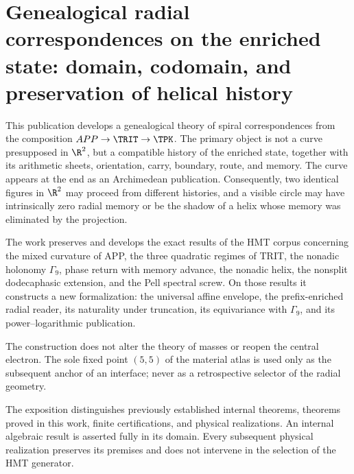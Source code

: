 \part{Genealogical radial correspondences on the enriched state: domain, codomain, and preservation of helical history}
This publication develops a genealogical theory of spiral
correspondences from the composition \(APP\to\TRIT\to\TPK\). The primary object
is not a curve presupposed in \(\R^2\), but a compatible history of the
enriched state, together with its arithmetic sheets, orientation, carry,
boundary, route, and memory. The curve appears at the end as an
Archimedean publication. Consequently, two identical figures in
\(\R^2\) may proceed from different histories, and a visible circle
may have intrinsically zero radial memory or be the shadow of
a helix whose memory was eliminated by the projection.

The work preserves and develops the exact results of the HMT corpus concerning
the mixed curvature of APP, the three quadratic regimes of TRIT, the
nonadic holonomy \(\Gamma_9\), phase return with memory advance,
the nonadic helix, the nonsplit dodecaphasic extension, and the Pell
spectral screw. On those results it constructs a new formalization:
the universal affine envelope, the prefix-enriched radial reader, its
naturality under truncation, its equivariance with \(\Gamma_9\), and its
power--logarithmic publication.

The construction does not alter the theory of masses or reopen the central electron.
The sole fixed point \((5,5)\) of the material atlas is used only as
the subsequent anchor of an interface; never as a retrospective selector of the
radial geometry.

\medskip
\begin{statusbox}[title={Probative stratification by domain and codomain}]
The exposition distinguishes previously established internal theorems, theorems
proved in this work, finite certifications, and physical realizations. An
internal algebraic result is asserted fully in its domain. Every
subsequent physical realization preserves its premises and does not intervene in the
selection of the HMT generator.
\end{statusbox}


